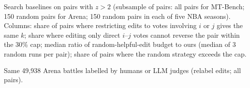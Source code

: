 \documentclass{article}
\begin{document}
\begin{table}[h]
\caption{Search baselines on pairs with $z>2$ (subsample of pairs: all pairs for MT-Bench; 150 random pairs for Arena; 150 random pairs in each of five NBA seasons). Columns: share of pairs where restricting edits to votes involving $i$ or $j$ gives the same $k$; share where editing only direct $i$--$j$ votes cannot reverse the pair within the 30\% cap; median ratio of random-helpful-edit budget to ours (median of 3 random runs per pair); share of pairs where the random strategy exceeds the cap.}\label{tab:baselines}
\centering\scriptsize
\resizebox{\linewidth}{!}{}
\end{table}

\begin{table}[h]
\caption{Same 49,938 Arena battles labelled by humans or LLM judges (relabel edits; all pairs).}\label{tab:judges}
\centering\scriptsize
\resizebox{\linewidth}{!}{}
\end{table}



\end{document}
